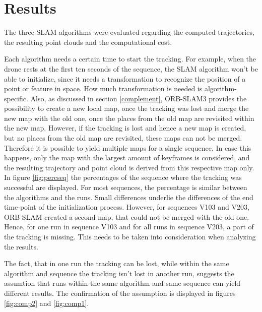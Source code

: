 \section{Results}

The three SLAM algorithms were evaluated regarding the computed trajectories, the resulting point clouds and
the computational cost. 



Each algorithm needs a certain time to start the tracking. For example, when the drone rests at the first ten seconds of the sequence, the SLAM 
algorithm won't be able to initialize, since it needs a transformation to recognize the position of a point or feature in space. How much transformation 
is needed is algorithm-specific. Also, as discussed in section \ref{complement}, ORB-SLAM3 provides the possibility to create a new local map, once the tracking
was lost and merge the new map with the old one, once the places from the old map are revisited within the new map. However, if the tracking is lost and hence 
a new map is created, but no places from the old map are revisited, these maps can not be merged. Therefore it is possible to yield multiple maps for 
a single sequence. In case this happens, only the map with the largest amount of keyframes is considered, and the resulting trajectory and point cloud is derived
from this respective map only. In figure \ref{fig:percseq} the percentages of the sequence where the tracking was successful are displayed. For most sequences, 
the percentage is similar between the algorithms and the runs. Small differences underlie the differences of the end time-point of the initialization process. However, 
for sequences V103 and V203, ORB-SLAM created a second map, that could not be merged with the old one. Hence, for one run in sequence V103 and for all runs in 
sequence V203, a part of the tracking is missing. This needs to be taken into consideration when analyzing the results. 

The fact, that in one run the tracking can be lost, while within the same algorithm and sequence the tracking isn't lost in another run, suggests the 
assumtion that runs within the same algorithm and same sequence can yield different results. The confirmation of the assumption is displayed in figures 
\ref{fig:comp2} and \ref{fig:comp1}. 


